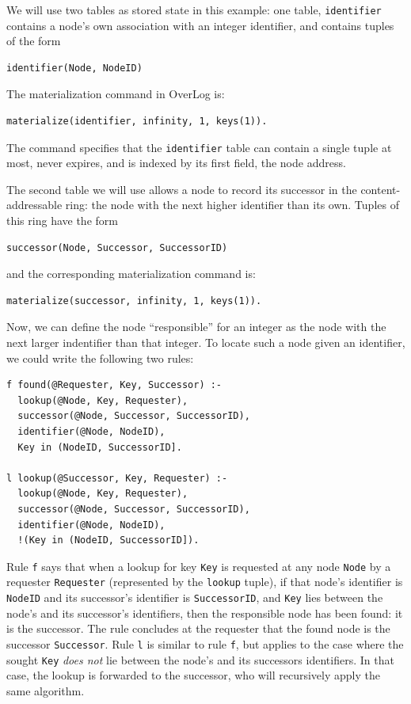 \documentclass{article}
\begin{document}
We will use two tables as stored state in this example: one table,
\lstinline$identifier$ contains a node's own association with an
integer identifier, and contains tuples of the form
\begin{lstlisting}
identifier(Node, NodeID)
\end{lstlisting}
The materialization command in OverLog is:
\begin{lstlisting}
materialize(identifier, infinity, 1, keys(1)).
\end{lstlisting}
The command specifies that the \lstinline$identifier$ table can contain
a single tuple at most, never expires, and is indexed by its first
field, the node address.

The second table we will use allows a node to record its successor in
the content-addressable ring: the node with the next higher identifier
than its own. Tuples of this ring have the form
\begin{lstlisting}
successor(Node, Successor, SuccessorID)
\end{lstlisting}
and the corresponding materialization command is:
\begin{lstlisting}
materialize(successor, infinity, 1, keys(1)).
\end{lstlisting}

Now, we can define the node ``responsible'' for an integer as the node
with the next larger indentifier than that integer.  To locate such a
node given an identifier, we could write the following two rules:
\begin{lstlisting}
f found(@Requester, Key, Successor) :-
  lookup(@Node, Key, Requester),
  successor(@Node, Successor, SuccessorID),
  identifier(@Node, NodeID),
  Key in (NodeID, SuccessorID].

l lookup(@Successor, Key, Requester) :-
  lookup(@Node, Key, Requester),
  successor(@Node, Successor, SuccessorID),
  identifier(@Node, NodeID),
  !(Key in (NodeID, SuccessorID]).
\end{lstlisting}
Rule \lstinline$f$ says that when a lookup for key \lstinline$Key$ is
requested at any node \lstinline$Node$ by a requester
\lstinline$Requester$ (represented by the \lstinline$lookup$ tuple), if
that node's identifier is \lstinline$NodeID$ and its successor's
identifier is \lstinline$SuccessorID$, and \lstinline$Key$ lies between
the node's and its successor's identifiers, then the responsible node
has been found: it is the successor. The rule concludes at the requester
that the found node is the successor \lstinline$Successor$.  Rule
\lstinline$l$ is similar to rule \lstinline$f$, but applies to the case
where the sought \lstinline$Key$ \emph{does not} lie between the node's
and its successors identifiers. In that case, the lookup is forwarded to
the successor, who will recursively apply the same algorithm.
\end{document}
